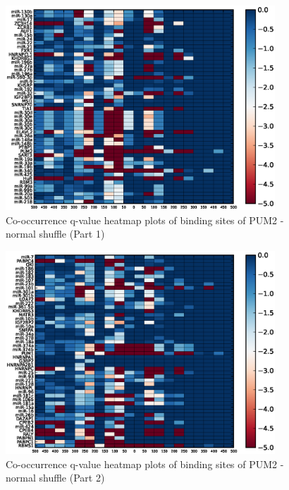 \begin{figure}
   	\includegraphics[width=0.9\textwidth]{appendix1/figures/PUM2_normal_expressed_heatmap_qvalues0.eps}
   	\caption{Co-occurrence q-value heatmap plots of binding sites of PUM2 - normal shuffle (Part 1)}
\end{figure}
\clearpage
\begin{figure}
   	\includegraphics[width=0.9\textwidth]{appendix1/figures/PUM2_normal_expressed_heatmap_qvalues1.eps}
   	\caption{Co-occurrence q-value heatmap plots of binding sites of PUM2 - normal shuffle (Part 2)}
\end{figure}

